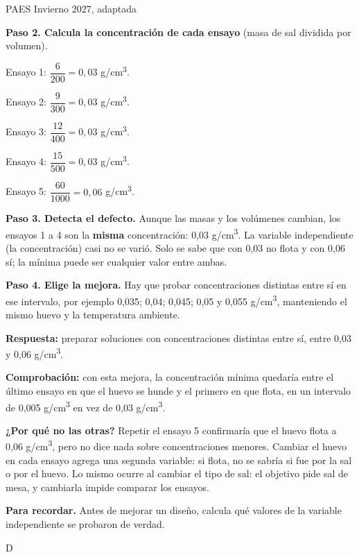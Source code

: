 \begin{elejemplo}{PAES Invierno 2027, adaptada}
{\textbf{Paso 2. Calcula la concentración de cada ensayo} (masa de sal dividida por volumen).\par Ensayo 1: $\dfrac{6}{200} = 0{,}03$ g/cm\textsuperscript{3}.\par Ensayo 2: $\dfrac{9}{300} = 0{,}03$ g/cm\textsuperscript{3}.\par Ensayo 3: $\dfrac{12}{400} = 0{,}03$ g/cm\textsuperscript{3}.\par Ensayo 4: $\dfrac{15}{500} = 0{,}03$ g/cm\textsuperscript{3}.\par Ensayo 5: $\dfrac{60}{1000} = 0{,}06$ g/cm\textsuperscript{3}.

\textbf{Paso 3. Detecta el defecto.} Aunque las masas y los volúmenes cambian, los ensayos 1 a 4 son la \textbf{misma} concentración: 0,03 g/cm\textsuperscript{3}. La variable independiente (la concentración) casi no se varió. Solo se sabe que con 0,03 no flota y con 0,06 sí; la mínima puede ser cualquier valor entre ambas.

\textbf{Paso 4. Elige la mejora.} Hay que probar concentraciones distintas entre sí en ese intervalo, por ejemplo 0,035; 0,04; 0,045; 0,05 y 0,055 g/cm\textsuperscript{3}, manteniendo el mismo huevo y la temperatura ambiente.

\textbf{Respuesta:} preparar soluciones con concentraciones distintas entre sí, entre 0,03 y 0,06 g/cm\textsuperscript{3}.

\textbf{Comprobación:} con esta mejora, la concentración mínima quedaría entre el último ensayo en que el huevo se hunde y el primero en que flota, en un intervalo de 0,005 g/cm\textsuperscript{3} en vez de 0,03 g/cm\textsuperscript{3}.

\textbf{¿Por qué no las otras?} Repetir el ensayo 5 confirmaría que el huevo flota a 0,06 g/cm\textsuperscript{3}, pero no dice nada sobre concentraciones menores. Cambiar el huevo en cada ensayo agrega una segunda variable: si flota, no se sabría si fue por la sal o por el huevo. Lo mismo ocurre al cambiar el tipo de sal: el objetivo pide sal de mesa, y cambiarla impide comparar los ensayos.

\textbf{\color{cienciaD}Para recordar.} Antes de mejorar un diseño, calcula qué valores de la variable independiente se probaron de verdad.}{D}
\end{elejemplo}

\clearpage\renewcommand{\cabeza}{Química · Solo Mención}
